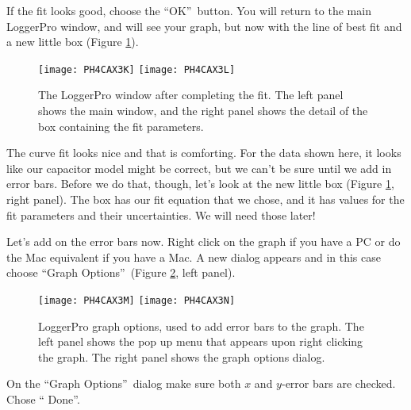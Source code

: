 If the fit looks good, choose the \textquotedblleft OK\textquotedblright\
button. You will return to the main LoggerPro window, and will see your
graph, but now with the line of best fit and a new little box
(Figure \ref{fig:fitcomplete}). 
\begin{figure}[tbp!]
	\centering
\texttt{[image: PH4CAX3K]}
\texttt{[image: PH4CAX3L]}
	\caption[The LoggerPro window after completing the fit]{The LoggerPro
	window after completing the fit. The left panel shows the main window,
	and the right panel shows the detail of the box containing the fit
	parameters.}
	\label{fig:fitcomplete}
\end{figure}
The curve fit looks nice and that
is comforting. For the data shown here, 
it looks like our capacitor model might be
correct, but we can't be sure until we add in error bars. Before we do that,
though,
let's look at the new little box (Figure \ref{fig:fitcomplete}, right panel). 
The box has our fit equation that
we chose, and it has values for the fit parameters and their uncertainties.
We will need those later!

Let's add on the error bars now. Right click on the graph if you have a PC
or do the Mac equivalent if you have a Mac. A new dialog appears and in this
case choose \textquotedblleft Graph Options\textquotedblright\ 
(Figure \ref{fig:graphopts}, left panel).
\begin{figure}[tbp!]
	\centering
\texttt{[image: PH4CAX3M]}
\texttt{[image: PH4CAX3N]}
	\caption[LoggerPro graph options]{LoggerPro graph options, used to
	add error bars to the graph. The left panel shows the pop up menu
	that appears upon right clicking the graph. The right panel shows the
	graph options dialog.}
	\label{fig:graphopts}
\end{figure}%
On the \textquotedblleft Graph Options\textquotedblright\ dialog make sure
both $x$ and $y$-error bars are checked.
Chose \textquotedblleft
Done\textquotedblright. 

